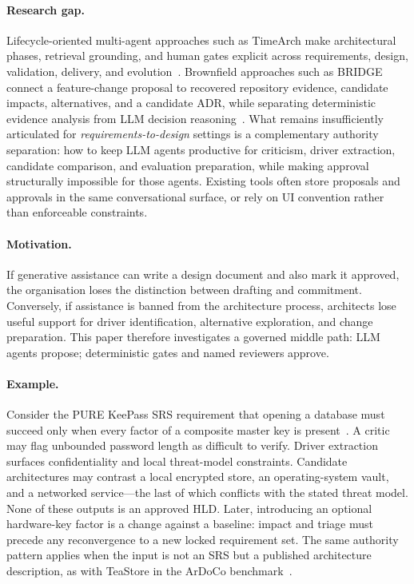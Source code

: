 \documentclass[conference]{IEEEtran}
\begin{document}
\paragraph{Research gap.}
Lifecycle-oriented multi-agent approaches such as TimeArch make architectural phases, retrieval grounding, and human gates explicit across requirements, design, validation, delivery, and evolution~\cite{waseem2026timearch}.
Brownfield approaches such as BRIDGE connect a feature-change proposal to recovered repository evidence, candidate impacts, alternatives, and a candidate ADR, while separating deterministic evidence analysis from LLM decision reasoning~\cite{waseem2026bridge}.
What remains insufficiently articulated for \emph{requirements-to-design} settings is a complementary authority separation: how to keep LLM agents productive for criticism, driver extraction, candidate comparison, and evaluation preparation, while making approval structurally impossible for those agents.
Existing tools often store proposals and approvals in the same conversational surface, or rely on UI convention rather than enforceable constraints.

\paragraph{Motivation.}
If generative assistance can write a design document and also mark it approved, the organisation loses the distinction between drafting and commitment.
Conversely, if assistance is banned from the architecture process, architects lose useful support for driver identification, alternative exploration, and change preparation.
This paper therefore investigates a governed middle path: LLM agents propose; deterministic gates and named reviewers approve.

\paragraph{Example.}
Consider the PURE KeePass SRS requirement that opening a database must succeed only when every factor of a composite master key is present~\cite{ferrari2017pure}.
A critic may flag unbounded password length as difficult to verify.
Driver extraction surfaces confidentiality and local threat-model constraints.
Candidate architectures may contrast a local encrypted store, an operating-system vault, and a networked service---the last of which conflicts with the stated threat model.
None of these outputs is an approved HLD.
Later, introducing an optional hardware-key factor is a change against a baseline: impact and triage must precede any reconvergence to a new locked requirement set.
The same authority pattern applies when the input is not an SRS but a published architecture description, as with TeaStore in the ArDoCo benchmark~\cite{kistowski2018teastore,fuchss2023ardoco}.
\end{document}
